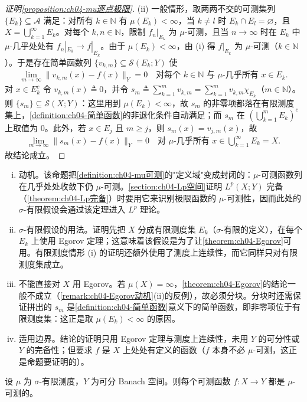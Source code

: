 \documentclass[../../main.tex]{subfiles}%
\begin{document}
\begin{proof}[证明\cref{proposition:ch04-mu逐点极限}]
(ii) 一般情形，取两两不交的可测集列 $\{E_k\}\subseteq\mathcal{A}$ 满足：对所有 $k\in\mathbb{N}$ 有 $\mu(E_k)<\infty$，当 $k\neq l$ 时 $E_k\cap E_l=\varnothing$，且 $X=\bigcup_{k=1}^\infty E_k$。对每个 $k,n\in\mathbb{N}$，限制 $f_n|_{E_k}$ 为 $\mu$-可测，且当 $n\to\infty$ 时在 $E_k$ 中 $\mu$-几乎处处有 $f_n|_{E_k}\to f|_{E_k}$。由于 $\mu(E_k)<\infty$，由 (i) 得 $f|_{E_k}$ 为 $\mu$-可测（$k\in\mathbb{N}$）。于是存在简单函数列 $\{v_{k,m}\}\subseteq\mathcal{S}(E_k;Y)$ 使
\begin{align*}
\lim_{m\to\infty}\|v_{k,m}(x)-f(x)\|_Y=0\quad\text{对每个 }k\in\mathbb{N}\text{ 与 }\mu\text{-几乎所有 }x\in E_k.
\end{align*}
对 $x\in E_k^c$ 令 $v_{k,m}(x)\triangleq 0$，并令 $s_m\triangleq \sum_{k=1}^m v_{k,m}=\sum_{k=1}^m v_{k,m}\chi_{E_k}$（$m\in\mathbb{N}$）。则 $\{s_m\}\subseteq\mathcal{S}(X;Y)$：这里用到 $\mu(E_k)<\infty$，故 $s_m$ 的非零项都落在有限测度集上，\cref{definition:ch04-简单函数}的非退化条件自动满足；而 $s_m$ 在 $(\bigcup_{k=1}^mE_k)^c$ 上取值为 $0$。此外，若 $x\in E_j$ 且 $m\geqslant j$，则 $s_m(x)=v_{j,m}(x)$，故
\begin{align*}
\lim_{m\to\infty}\|s_m(x)-f(x)\|_Y=0\quad\text{对 }\mu\text{-几乎所有 }x\in\bigcup_{k=1}^\infty E_k=X.
\end{align*}
故结论成立。
\end{proof}

\begin{remark}\label{remark:ch04-mu逐点极限动机}
\begin{enumerate}[(i)]
\item 动机。该命题把\cref{definition:ch04-mu可测}的"定义域"变成封闭的：$\mu$-可测函数列在几乎处处收敛下仍 $\mu$-可测。\cref{section:ch04-Lp空间}证明 $L^p(X;Y)$ 完备（\cref{theorem:ch04-Lp完备}）时要用它来识别极限函数的 $\mu$-可测性，因而此处的 $\sigma$-有限假设会通过该定理进入 $L^p$ 理论。
\item $\sigma$-有限假设的用法。证明先把 $X$ 分成有限测度集 $E_k$（$\sigma$-有限的定义），在每个 $E_k$ 上使用 Egorov 定理；这意味着该假设是为了让\cref{theorem:ch04-Egorov}可用。有限测度情形 (i) 的证明还额外使用了测度上连续性，而它同样只对有限测度集成立。
\item 不能直接对 $X$ 用 Egorov。若 $\mu(X)=\infty$，\cref{theorem:ch04-Egorov}的结论一般不成立（\cref{remark:ch04-Egorov动机}(ii)的反例），故必须分块。分块时还需保证拼出的 $s_m$ 是\cref{definition:ch04-简单函数}意义下的简单函数，即非零项位于有限测度集：这正是取 $\mu(E_k)<\infty$ 的原因。
\item 适用边界。结论的证明只用 Egorov 定理与测度上连续性，未用 $Y$ 的可分性或 $Y$ 的完备性；但要求 $f$ 是 $X$ 上处处有定义的函数（$f$ 本身不必 $\mu$-可测，这正是命题要证明的）。
\end{enumerate}
\end{remark}
\begin{proposition}\label{proposition:ch04-可推mu可}
设 $\mu$ 为 $\sigma$-有限测度，$Y$ 为可分 Banach 空间。则每个可测函数 $f:X\to Y$ 都是 $\mu$-可测的。
\end{proposition}
\end{document}
